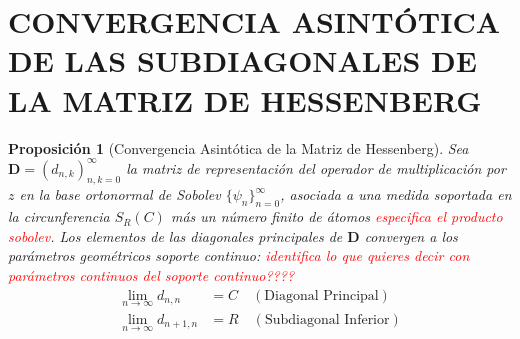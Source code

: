 \documentclass[12pt,a4paper]{article}
\newtheorem{proposicion}{Proposición}
\begin{document}
\section{CONVERGENCIA ASINTÓTICA DE LAS SUBDIAGONALES DE LA MATRIZ DE HESSENBERG}


\begin{proposicion}[Convergencia Asintótica de la Matriz de Hessenberg]
Sea $\mathbf{D} = (d_{n,k})_{n,k=0}^\infty$ la matriz de representación del operador de multiplicación por $z$ en la base ortonormal de Sobolev $\{\psi_n\}_{n=0}^\infty$, asociada a una medida soportada en la circunferencia $S_R(C)$ más un número finito de átomos \textcolor{red}{especifica el producto sobolev}.
Los elementos de las diagonales principales de $\mathbf{D}$ convergen a los parámetros geométricos  soporte continuo: \textcolor{red}{identifica lo que quieres decir con parámetros continuos del soporte continuo????}
\begin{align}
    \lim_{n \to \infty} d_{n, n} &= C \quad (\text{Diagonal Principal}) \\
    \lim_{n \to \infty} d_{n+1, n} &= R \quad (\text{Subdiagonal Inferior})
\end{align}
\end{proposicion}
\end{document}
